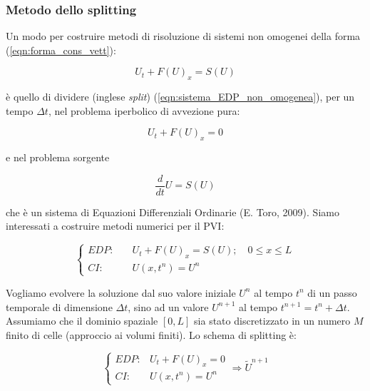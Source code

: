 \documentclass[12pt]{article} %
\begin{document}
\subsubsection{Metodo dello splitting}

\noindent Un modo per costruire metodi di risoluzione di sistemi non omogenei della forma (\ref{eqn:forma_cons_vett}):

\begin{equation}
    U_t+F(U)_x=S(U)
    \label{eqn:sistema_EDP_non_omogenea}
\end{equation}

\noindent è quello di dividere (inglese \textit{split}) (\ref{eqn:sistema_EDP_non_omogenea}), per un tempo $\Delta t$, nel problema iperbolico di avvezione pura:

\begin{equation}
    U_t+F(U)_x = 0
    \label{eqn:avvezione_pura}
\end{equation}

\noindent e nel problema sorgente

\begin{equation}
    \frac{d}{dt}U = S(U)
\end{equation}

\noindent che è un sistema di Equazioni Differenziali Ordinarie (E. Toro, 2009).
Siamo interessati a costruire metodi numerici per il PVI:

\begin{equation}
    \begin{cases} EDP:\quad &U_t+F(U)_x = S(U);\quad 0\leq x \leq L\\
    CI: &U(x,t^n)=U^n
    \end{cases}
    \label{eqn:PVI_completo}
\end{equation}

\noindent Vogliamo evolvere la soluzione dal suo valore iniziale $U^n$ al tempo $t^n$ di un passo temporale di dimensione $\Delta t$, sino ad un valore $U^{n+1}$ al tempo $t^{n+1} = t^n + \Delta t$. Assumiamo che il dominio spaziale $[0, L]$ sia stato discretizzato in un numero $M$ finito di celle (approccio ai volumi finiti). Lo schema di splitting è:

\begin{equation}
    \left\{\begin{array}{lr}
        EDP: & U_t+F(U)_x = 0\\
        CI: & U(x,t^n)=U^n
        \end{array}
    \right. \Longrightarrow \tilde{U}^{n+1}
    \label{eqn:PVI_avvettivo}
\end{equation}
\end{document}

